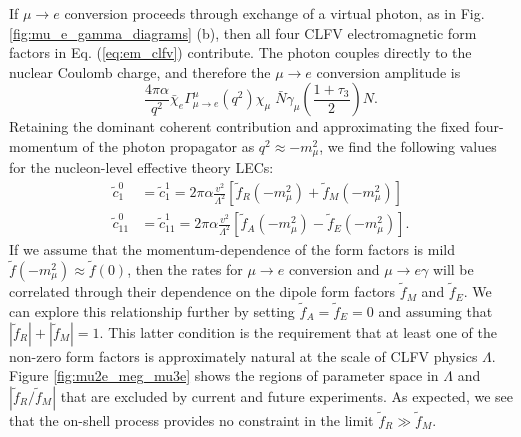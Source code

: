 \documentclass[12pt,letterpaper]{book}
\begin{document}
If $\mu\rightarrow e$ conversion proceeds through exchange of a virtual photon, as in Fig. \ref{fig:mu_e_gamma_diagrams} (b), then all four CLFV electromagnetic form factors in Eq. (\ref{eq:em_clfv}) contribute. The photon couples directly to the nuclear Coulomb charge, and therefore the $\mu\rightarrow e$ conversion amplitude is
\begin{equation}
\frac{4\pi\alpha}{q^2}\bar{\chi}_e\Gamma^{\mu}_{\mu\rightarrow e}(q^2)\chi_{\mu}\;\bar{N}\gamma_{\mu}\left(\frac{1+\tau_3}{2}\right)N.
\end{equation}
Retaining the dominant coherent contribution and approximating the fixed four-momentum of the photon propagator as $q^2\approx -m_{\mu}^2$, we find the following values for the nucleon-level effective theory LECs:
\begin{equation}
\begin{split}
\tilde{c}_1^0&=\tilde{c}_1^1=2\pi\alpha\frac{v^2}{\Lambda^2}\left[\tilde{f}_R(-m_{\mu}^2)+\tilde{f}_M(-m_{\mu}^2)\right]\\
\tilde{c}_{11}^0&=\tilde{c}_{11}^1=2\pi\alpha\frac{v^2}{\Lambda^2}\left[\tilde{f}_A(-m_{\mu}^2)-\tilde{f}_E(-m_{\mu}^2)\right].
\end{split}
\end{equation}
If we assume that the momentum-dependence of the form factors is mild $\tilde{f}(-m_{\mu}^2)\approx \tilde{f}(0)$, then the rates for $\mu\rightarrow e$ conversion and $\mu\rightarrow e\gamma$ will be correlated through their dependence on the dipole form factors $\tilde{f}_M$ and $\tilde{f}_E$. We can explore this relationship further by setting $\tilde{f}_A=\tilde{f}_E=0$ and assuming that $|\tilde{f}_R|+|\tilde{f}_M|=1$. This latter condition is the requirement that at least one of the non-zero form factors is approximately natural at the scale of CLFV physics $\Lambda$. Figure \ref{fig:mu2e_meg_mu3e} shows the regions of parameter space in $\Lambda$ and $|\tilde{f}_R/\tilde{f}_M|$ that are excluded by current and future experiments. As expected, we see that the on-shell process provides no constraint in the limit $\tilde{f}_R\gg \tilde{f}_M$. 
\end{document}
